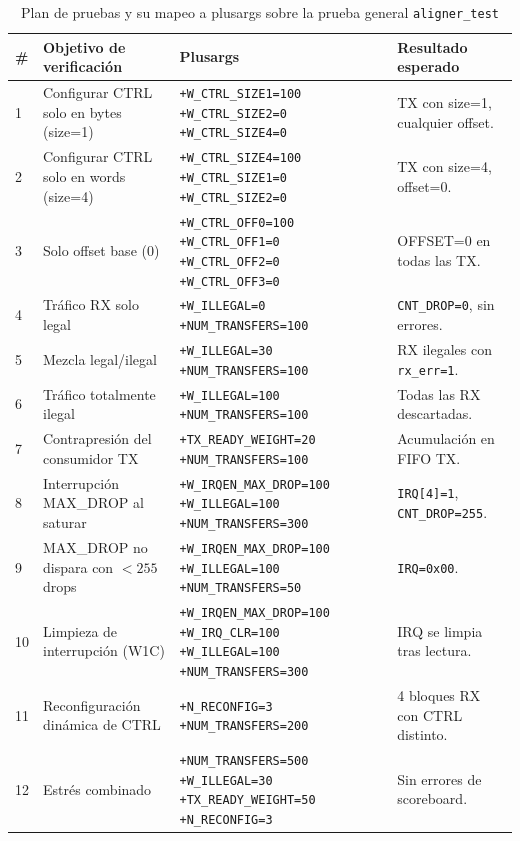 \documentclass[conference]{IEEEtran}
\begin{document}
\begin{table}[t]
\caption{Plan de pruebas y su mapeo a plusargs sobre la prueba general \texttt{aligner\_test}}
\label{tab:testplan}
\centering
\footnotesize
\begin{tabular}{@{}p{0.4cm}p{4.3cm}p{8.5cm}p{2.6cm}@{}}
\toprule
\textbf{\#} & \textbf{Objetivo de verificación} & \textbf{Plusargs} & \textbf{Resultado esperado} \\
\midrule
1 & Configurar CTRL solo en bytes (size=1) & \texttt{+W\_CTRL\_SIZE1=100 +W\_CTRL\_SIZE2=0 +W\_CTRL\_SIZE4=0} & TX con size=1, cualquier offset. \\
2 & Configurar CTRL solo en words (size=4) & \texttt{+W\_CTRL\_SIZE4=100 +W\_CTRL\_SIZE1=0 +W\_CTRL\_SIZE2=0} & TX con size=4, offset=0. \\
3 & Solo offset base (0) & \texttt{+W\_CTRL\_OFF0=100 +W\_CTRL\_OFF1=0 +W\_CTRL\_OFF2=0 +W\_CTRL\_OFF3=0} & OFFSET=0 en todas las TX. \\
4 & Tráfico RX solo legal & \texttt{+W\_ILLEGAL=0 +NUM\_TRANSFERS=100} & \texttt{CNT\_DROP=0}, sin errores. \\
5 & Mezcla legal/ilegal & \texttt{+W\_ILLEGAL=30 +NUM\_TRANSFERS=100} & RX ilegales con \texttt{rx\_err=1}. \\
6 & Tráfico totalmente ilegal & \texttt{+W\_ILLEGAL=100 +NUM\_TRANSFERS=100} & Todas las RX descartadas. \\
7 & Contrapresión del consumidor TX & \texttt{+TX\_READY\_WEIGHT=20 +NUM\_TRANSFERS=100} & Acumulación en FIFO TX. \\
8 & Interrupción MAX\_DROP al saturar & \texttt{+W\_IRQEN\_MAX\_DROP=100 +W\_ILLEGAL=100 +NUM\_TRANSFERS=300} & \texttt{IRQ[4]=1}, \texttt{CNT\_DROP=255}. \\
9 & MAX\_DROP no dispara con $<255$ drops & \texttt{+W\_IRQEN\_MAX\_DROP=100 +W\_ILLEGAL=100 +NUM\_TRANSFERS=50} & \texttt{IRQ=0x00}. \\
10 & Limpieza de interrupción (W1C) & \texttt{+W\_IRQEN\_MAX\_DROP=100 +W\_IRQ\_CLR=100 +W\_ILLEGAL=100 +NUM\_TRANSFERS=300} & IRQ se limpia tras lectura. \\
11 & Reconfiguración dinámica de CTRL & \texttt{+N\_RECONFIG=3 +NUM\_TRANSFERS=200} & 4 bloques RX con CTRL distinto. \\
12 & Estrés combinado & \texttt{+NUM\_TRANSFERS=500 +W\_ILLEGAL=30 +TX\_READY\_WEIGHT=50 +N\_RECONFIG=3} & Sin errores de scoreboard. \\
\bottomrule
\end{tabular}
\end{table}
\end{document}
